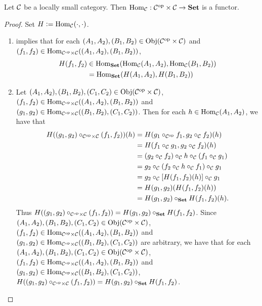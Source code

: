 \documentclass{book}
\begin{document}
\begin{ex} 
	Let $\mathcal{C}$ be a locally small category. Then $\operatorname{Hom}_{\mathcal{C}}:{\mathcal{C}}^{\text{op}} \times \mathcal{C} \rightarrow \text{\textbf{Set}}$ is a functor. 
\end{ex}

\begin{proof}
	Set $H \vcentcolon= \operatorname{Hom}_{\mathcal{C}}(\cdot, \cdot)$.
	\begin{enumerate}
	\item {} implies that for each $(A_1, A_2), (B_1, B_2) \in \operatorname{Obj}({\mathcal{C}}^{\text{op}} \times \mathcal{C})$ and $(f_1, f_2) \in \operatorname{Hom}_{{\mathcal{C}}^{\text{op}} \times \mathcal{C}}((A_1, A_2), (B_1, B_2))$, 
	\begin{align*}
		H(f_1, f_2) 
		& \in \operatorname{Hom}_{\text{\textbf{Set}}}(\operatorname{Hom}_{\mathcal{C}}(A_1, A_2), \operatorname{Hom}_{\mathcal{C}}(B_1, B_2)) \\
		& = \operatorname{Hom}_{\text{\textbf{Set}}}(H(A_1, A_2), H(B_1, B_2))
	\end{align*}
	\item Let $(A_1, A_2), (B_1, B_2), (C_1, C_2) \in \operatorname{Obj}({\mathcal{C}}^{\text{op}} \times \mathcal{C})$, $(f_1, f_2) \in \operatorname{Hom}_{{\mathcal{C}}^{\text{op}} \times \mathcal{C}}((A_1, A_2), (B_1, B_2))$ and $(g_1, g_2) \in \operatorname{Hom}_{{\mathcal{C}}^{\text{op}} \times \mathcal{C}}((B_1, B_2), (C_1, C_2))$. Then for each $h \in \operatorname{Hom}_{\mathcal{C}}(A_1, A_2)$, we have that 
	\begin{align*}
		H((g_1, g_2) \circ_{{\mathcal{C}}^{\text{op}} \times \mathcal{C}}(f_1, f_2))(h)
		& = H(g_1 \circ_{{\mathcal{C}}^{\text{op}}} f_1, g_2 \circ_{\mathcal{C}} f_2)(h) \\
		& = H(f_1 \circ_{\mathcal{C}} g_1, g_2 \circ_{\mathcal{C}} f_2)(h) \\
		& = (g_2 \circ_{\mathcal{C}} f_2) \circ_{\mathcal{C}} h \circ_{\mathcal{C}} (f_1 \circ_{\mathcal{C}} g_1) \\
		& = g_2 \circ_{\mathcal{C}} (f_2 \circ_{\mathcal{C}} h \circ_{\mathcal{C}} f_1) \circ_{\mathcal{C}} g_1 \\
		& = g_2 \circ_{\mathcal{C}} [H(f_1, f_2)(h)] \circ_{\mathcal{C}} g_1 \\
		& = H(g_1, g_2)(H(f_1, f_2)(h)) \\
		& = H(g_1, g_2) \circ_{\text{\textbf{Set}}} H(f_1, f_2)(h).
	\end{align*}
	Thus $H((g_1, g_2) \circ_{{\mathcal{C}}^{\text{op}} \times \mathcal{C}}(f_1, f_2)) = H(g_1, g_2) \circ_{\text{\textbf{Set}}}  H(f_1, f_2)$. Since $(A_1, A_2), (B_1, B_2), (C_1, C_2) \in \operatorname{Obj}({\mathcal{C}}^{\text{op}} \times \mathcal{C})$, $(f_1, f_2) \in \operatorname{Hom}_{{\mathcal{C}}^{\text{op}} \times \mathcal{C}}((A_1, A_2), (B_1, B_2))$ and $(g_1, g_2) \in \operatorname{Hom}_{{\mathcal{C}}^{\text{op}} \times \mathcal{C}}((B_1, B_2), (C_1, C_2))$ are arbitrary, we have that for each $(A_1, A_2), (B_1, B_2), (C_1, C_2) \in \operatorname{Obj}({\mathcal{C}}^{\text{op}} \times \mathcal{C})$, $(f_1, f_2) \in \operatorname{Hom}_{{\mathcal{C}}^{\text{op}} \times \mathcal{C}}((A_1, A_2), (B_1, B_2))$ and $(g_1, g_2) \in \operatorname{Hom}_{{\mathcal{C}}^{\text{op}} \times \mathcal{C}}((B_1, B_2), (C_1, C_2))$, $H((g_1, g_2) \circ_{{\mathcal{C}}^{\text{op}} \times \mathcal{C}}(f_1, f_2)) = H(g_1, g_2) \circ_{\text{\textbf{Set}}} H(f_1, f_2)$. 

\end{enumerate}
\end{proof}
\end{document}
